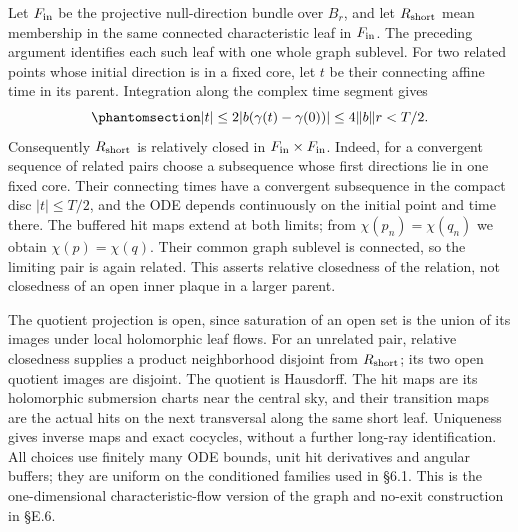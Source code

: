\documentclass[
  english,
  11pt,
  reqno]{amsart}
\begin{document}
Let \(F_{\rm in}\) be the projective null-direction bundle over \(B_r\),
and let \(R_{\rm short}\) mean membership in the same connected
characteristic leaf in \(F_{\rm in}\). The preceding argument identifies
each such leaf with one whole graph sublevel. For two related points
whose initial direction is in a fixed core, let \(t\) be their
connecting affine time in its parent. Integration along the complex time
segment gives
\begin{equation}\protect\phantomsection\label{eq:gg-short-ray-time-buffer}{
 |t|\le2|b(\gamma(t)-\gamma(0))|
       \le4\|b\|r<T/2.
}\end{equation} Consequently \(R_{\rm short}\) is relatively closed in
\(F_{\rm in}\times F_{\rm in}\). Indeed, for a convergent sequence of
related pairs choose a subsequence whose first directions lie in one
fixed core. Their connecting times have a convergent subsequence in the
compact disc \(|t|\le T/2\), and the ODE depends continuously on the
initial point and time there. The buffered hit maps extend at both
limits; from \(\chi(p_n)=\chi(q_n)\) we obtain \(\chi(p)=\chi(q)\).
Their common graph sublevel is connected, so the limiting pair is again
related. This asserts relative closedness of the relation, not
closedness of an open inner plaque in a larger parent.

The quotient projection is open, since saturation of an open set is the
union of its images under local holomorphic leaf flows. For an unrelated
pair, relative closedness supplies a product neighborhood disjoint from
\(R_{\rm short}\); its two open quotient images are disjoint. The
quotient is Hausdorff. The hit maps are its holomorphic submersion
charts near the central sky, and their transition maps are the actual
hits on the next transversal along the same short leaf. Uniqueness gives
inverse maps and exact cocycles, without a further long-ray
identification. All choices use finitely many ODE bounds, unit hit
derivatives and angular buffers; they are uniform on the conditioned
families used in §6.1. This is the one-dimensional characteristic-flow
version of the graph and no-exit construction in §E.6.
\end{document}
